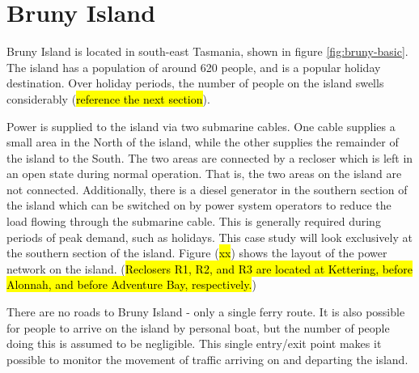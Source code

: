 \section{Bruny Island}
Bruny Island is located in south-east Tasmania, shown in figure \ref{fig:bruny-basic}.
The island has a population of around 620 people, and is a popular holiday destination.
Over holiday periods, the number of people on the island swells considerably (\hl{reference the next section}).
\par
Power is supplied to the island via two submarine cables.
One cable supplies a small area in the North of the island, while the other supplies the remainder of the island to the South.
The two areas are connected by a recloser which is left in an open state during normal operation.
That is, the two areas on the island are not connected.
Additionally, there is a diesel generator in the southern section of the island which can be switched on by power system operators to reduce the load flowing through the submarine cable.
This is generally required during periods of peak demand, such as holidays.
This case study will look exclusively at the southern section of the island.
Figure (\hl{xx}) shows the layout of the power network on the island.
(\hl{Reclosers R1, R2, and R3 are located at Kettering, before Alonnah, and before Adventure Bay, respectively.})

There are no roads to Bruny Island - only a single ferry route.
It is also possible for people to arrive on the island by personal boat, but the number of people doing this is assumed to be negligible.
This single entry/exit point makes it possible to monitor the movement of traffic arriving on and departing the island.



